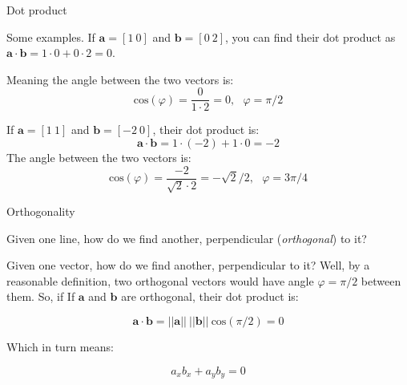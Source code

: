 \documentclass{beamer}
\begin{document}
\begin{frame}{Dot product}
	\begin{flushleft}
		
		Some examples. If $\mathbf a = [1 \ 0]$ and $\mathbf b = [0 \ 2]$, you can find their dot product as $\mathbf a \cdot \mathbf b = 1 \cdot 0 + 0 \cdot 2 = 0$.

	Meaning the angle between the two vectors is:
	\begin{equation}
		\text{cos}(\varphi) = 
		\frac{0}{1 \cdot 2} = 0, \ \ \ \varphi = \pi/2
	\end{equation}	

\bigskip

If $\mathbf a = [1 \ 1]$ and $\mathbf b = [-2 \ 0]$, their dot product is:
%
\begin{equation}
	\mathbf a \cdot \mathbf b = 1 \cdot (-2) + 1 \cdot 0 = -2
\end{equation}	
%
The angle between the two vectors is:
%
\begin{equation}
	\text{cos}(\varphi) = 
	\frac{-2}{\sqrt{2} \cdot 2} = -\sqrt{2} / 2, \ \ \ \varphi = 3\pi/4
\end{equation}	
		
	\end{flushleft}
\end{frame}




\begin{frame}{Orthogonality}
	\begin{flushleft}
		
		Given one line, how do we find another, perpendicular (\emph{orthogonal}) to it?
		
		\bigskip
		
		Given one vector, how do we find another, perpendicular to it? Well, by a reasonable definition, two orthogonal vectors would have angle $\varphi = \pi/2$ between them. So, if If $\mathbf a$ and $\mathbf b$ are orthogonal, their dot product is:
		
		\begin{equation}
			\mathbf a \cdot \mathbf b = 
			||\mathbf a|| \ ||\mathbf b|| \ \text{cos}(\pi/2) = 0
		\end{equation}	
		
		Which in turn means:
		
		\begin{equation}
			a_x b_x + a_y b_y = 0
		\end{equation}	
		
	\end{flushleft}
\end{frame}
\end{document}

